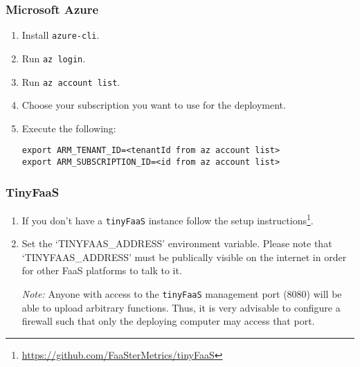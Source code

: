 \documentclass[../main.tex]{subfiles}
\begin{document}
\subsubsection{Microsoft Azure}\label{sec:providersetupazure}
\begin{enumerate}
\item Install \texttt{azure-cli}.
\item Run \texttt{az login}.
\item Run \texttt{az account list}.
\item Choose your subscription you want to use for the deployment.
\item Execute the following: 
  \begin{tcolorbox}
    \texttt{export ARM\_TENANT\_ID=<tenantId from az account list>}\\
    \texttt{export ARM\_SUBSCRIPTION\_ID=<id from az account list>}\\
  \end{tcolorbox}
\end{enumerate}

\subsubsection{TinyFaaS}\label{sec:providersetuptinyfaas}

\begin{enumerate}
  \item If you don't have a \texttt{tinyFaaS} instance follow the setup instructions\footnote{\url{https://github.com/FaaSterMetrics/tinyFaaS}}.
\item Set the `TINYFAAS\_ADDRESS' environment variable. 
  Please note that `TINYFAAS\_ADDRESS' must be publically visible on the internet in order for other FaaS platforms to talk to it. 

  \textit{Note:} Anyone with access to the \texttt{tinyFaaS} management port (8080) will be able to upload arbitrary functions. 
  Thus, it is very advisable to configure a firewall such that only the deploying computer may access that port.

\end{enumerate}
\end{document}
